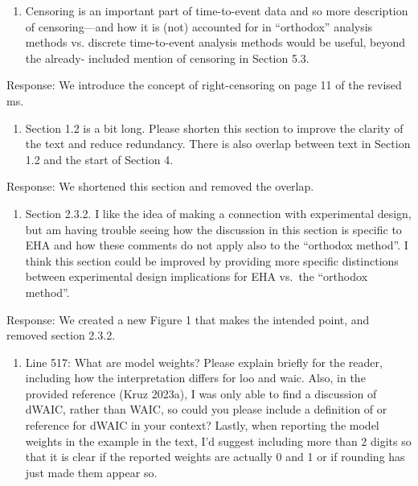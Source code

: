 \documentclass[
]{article}
\providecommand{\tightlist}{%
  \setlength{\itemsep}{0pt}\setlength{\parskip}{0pt}}
\renewenvironment{quote}{\begin{leftbar}}{\end{leftbar}}
\begin{document}
\begin{quote}
\begin{enumerate}
\def\labelenumi{\arabic{enumi}.}
\setcounter{enumi}{2}
\tightlist
\item
  Censoring is an important part of time-to-event data and so more
  description of censoring---and how it is (not) accounted for in
  ``orthodox'' analysis methods vs. discrete time-to-event analysis
  methods would be useful, beyond the already- included mention of
  censoring in Section 5.3.
\end{enumerate}
\end{quote}

Response: We introduce the concept of right-censoring on page 11 of the
revised ms.

\begin{quote}
\begin{enumerate}
\def\labelenumi{\arabic{enumi}.}
\setcounter{enumi}{3}
\tightlist
\item
  Section 1.2 is a bit long. Please shorten this section to improve the
  clarity of the text and reduce redundancy. There is also overlap
  between text in Section 1.2 and the start of Section 4.
\end{enumerate}
\end{quote}

Response: We shortened this section and removed the overlap.

\begin{quote}
\begin{enumerate}
\def\labelenumi{\arabic{enumi}.}
\setcounter{enumi}{4}
\tightlist
\item
  Section 2.3.2. I like the idea of making a connection with
  experimental design, but am having trouble seeing how the discussion
  in this section is specific to EHA and how these comments do not apply
  also to the ``orthodox method''. I think this section could be
  improved by providing more specific distinctions between experimental
  design implications for EHA vs.~the ``orthodox method''.
\end{enumerate}
\end{quote}

Response: We created a new Figure 1 that makes the intended point, and
removed section 2.3.2.

\begin{quote}
\begin{enumerate}
\def\labelenumi{\arabic{enumi}.}
\setcounter{enumi}{5}
\tightlist
\item
  Line 517: What are model weights? Please explain briefly for the
  reader, including how the interpretation differs for loo and waic.
  Also, in the provided reference (Kruz 2023a), I was only able to find
  a discussion of dWAIC, rather than WAIC, so could you please include a
  definition of or reference for dWAIC in your context? Lastly, when
  reporting the model weights in the example in the text, I'd suggest
  including more than 2 digits so that it is clear if the reported
  weights are actually 0 and 1 or if rounding has just made them appear
  so.
\end{enumerate}
\end{quote}
\end{document}
